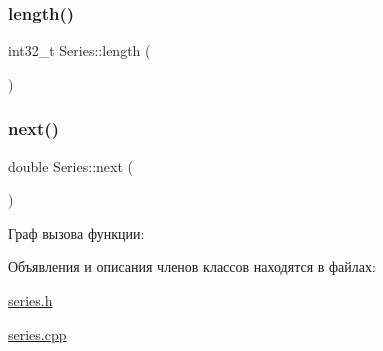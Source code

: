 \subsubsection{\texorpdfstring{length()}{length()}}
{\footnotesize\ttfamily int32\+\_\+t Series\+::length (\begin{DoxyParamCaption}{ }\end{DoxyParamCaption})}

\mbox{\label{class_series_a0c87433f79b7d3359d986e130225d469}} 
\subsubsection{\texorpdfstring{next()}{next()}}
{\footnotesize\ttfamily double Series\+::next (\begin{DoxyParamCaption}{ }\end{DoxyParamCaption})}

Граф вызова функции\+:


Объявления и описания членов классов находятся в файлах\+:\begin{DoxyCompactItemize}
\item 
\hyperlink{series_8h}{series.\+h}\item 
\hyperlink{series_8cpp}{series.\+cpp}\end{DoxyCompactItemize}
